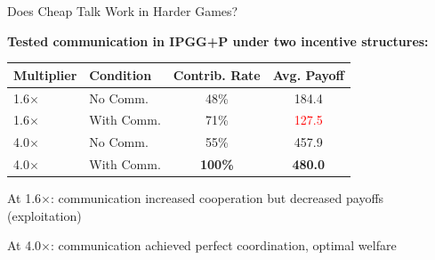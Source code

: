 \documentclass[aspectratio=169]{beamer}
\begin{document}
\begin{frame}{Does Cheap Talk Work in Harder Games?}
  
  \textbf{Tested communication in IPGG+P under two incentive structures:}
  
  \vspace{0.5em}
  \begin{table}
    \centering
    \begin{tabular}{llcc}
      \toprule
      Multiplier & Condition & Contrib. Rate & Avg. Payoff \\
      \midrule
      1.6$\times$ & No Comm. & 48\% & 184.4 \\
      1.6$\times$ & With Comm. & 71\% & \textcolor{red}{127.5} \\
      \midrule
      4.0$\times$ & No Comm. & 55\% & 457.9 \\
      4.0$\times$ & With Comm. & \textbf{100\%} & \textbf{480.0} \\
      \bottomrule
    \end{tabular}
  \end{table}
  
  \vspace{0.5em}
  At 1.6$\times$: communication increased cooperation but decreased payoffs (exploitation)
  
  \vspace{0.3em}
  At 4.0$\times$: communication achieved perfect coordination, optimal welfare

\end{frame}
\end{document}
